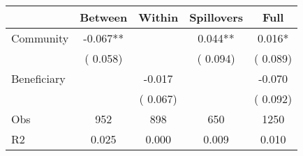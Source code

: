 
\begin{tabular}{l*{4}{c}}\hline&\multicolumn{1}{c}{Between}&\multicolumn{1}{c}{Within}&\multicolumn{1}{c}{Spillovers}&\multicolumn{1}{c}{Full}\\ \hline
 Community             &             -0.067**      &                                               &        0.044** &         0.016*                            \\ 
                               &        (       0.058)           &                                       &       (       0.094)     &      (       0.089)                                           \\ 
 Beneficiary   &                                               &       -0.017    &                                &            -0.070                            \\ 
                               &                                               & (       0.067)                  &                                        &      (       0.092)                                           \\ 
\hline                                                                                                                                                                                                                                            
 Obs                   &               952               &       898                       &       650                &              1250                                               \\ 
 R2                    &                      0.025              &              0.000                      &              0.009               &                     0.010                                              \\ 
\hline \end{tabular}                                                                                                                                                                                                              